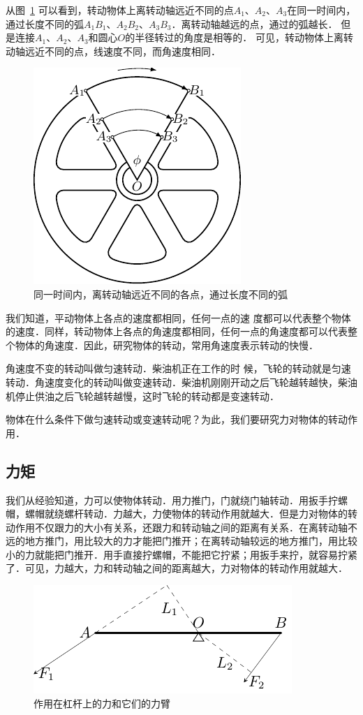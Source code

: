 从图~\ref{fig_A_6-6} 可以看到，转动物体上离转动轴远近不同的点$A_1$、$A_2$、$A_3$在同一时间内，通过长度不同的弧$A_1B_1$、$A_2B_2$、$A_3B_3$．离转动轴越远的点，通过的弧越长．
但是连接$A_1$、$A_2$、$A_3$和圆心$O$的半径转过的角度是相等的．
可见，转动物体上离转动轴远近不同的点，线速度不同，而角速度相同．
\begin{figure}[htbp]
	\centering
	\includegraphics{fig/A/6-6.pdf}
	\caption{同一时间内，离转动轴远近不同的各点，通过长度不同的弧}\label{fig_A_6-6}
\end{figure}

我们知道，平动物体上各点的速度都相同，任何一点的速
度都可以代表整个物体的速度．同样，转动物体上各点的角速度都相同，任何一点的角速度都可以代表整个物体的角速度．因此，研究物体的转动，常用角速度表示转动的快慢．

角速度不变的转动叫做匀速转动．柴油机正在工作的时
候，飞轮的转动就是匀速转动．角速度变化的转动叫做变速转动．柴油机刚刚开动之后飞轮越转越快，柴油机停止供油之后飞轮越转越慢，这时飞轮的转动都是变速转动．

物体在什么条件下做匀速转动或变速转动呢？为此，我们要研究力对物体的转动作用．



\subsection{力矩} 

我们从经验知道，力可以使物体转动．用力推门，门就绕门轴转动．用扳手拧螺帽，螺帽就绕螺杆转动．力越大，力使物体的转动作用就越大．但是力对物体的转动作用不仅跟力的大小有关系，还跟力和转动轴之间的距离有关系．在离转动轴不远的地方推门，用比较大的力才能把门推开；在离转动轴较远的地方推门，用比较小的力就能把门推开．用手直接拧螺帽，不能把它拧紧；用扳手来拧，就容易拧紧了．可见，力越大，力和转动轴之间的距离越大，力对物体的转动作用就越大．
\begin{figure}[htbp]
    \centering
    \includegraphics{fig/A/6-7.pdf}
    \caption{作用在杠杆上的力和它们的力臂}\label{fig_A_6-7}
\end{figure}

